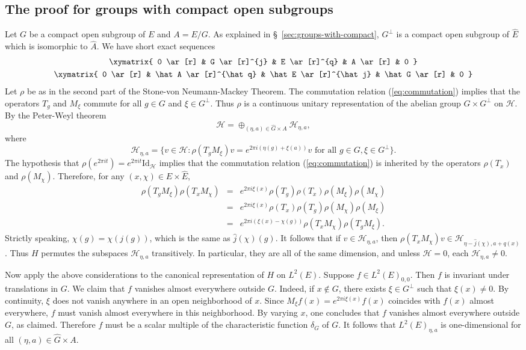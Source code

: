 \documentclass[11pt]{amsart}
\numberwithin{equation}{section}
\theoremstyle{plain}
\theoremstyle{definition}
\newcommand{\Hilb}{\mathcal H}
\newcommand{\ses}[5]{
  \xymatrix{
    0 \ar[r] & #1 \ar[r]^{#4} & #2 \ar[r]^{#5} & #3 \ar[r] & 0
  }
}
\begin{document}
\subsection{The proof for groups with compact open subgroups}
\label{sec:proof-groups-with}
Let $G$ be a compact open subgroup of $E$ and $A=E/G$.
As explained in \S~\ref{sec:groups-with-compact}, $G^\perp$ is a compact open subgroup of $\hat E$ which is isomorphic to $\hat A$.
We have short exact sequences
\begin{gather*}
  \ses G E A j q\\
  \ses {\hat A}{\hat E}{\hat G}{\hat q}{\hat j}
\end{gather*}
Let $\rho$ be as in the second part of the Stone-von Neumann-Mackey Theorem.
The commutation relation (\ref{eq:commutation}) implies that the operators $T_g$ and $M_\xi$ commute for all $g\in G$ and $\xi\in G^\perp$.
Thus $\rho$ is a continuous unitary representation of the abelian group $G\times G^\perp$ on $\Hilb$.
By the Peter-Weyl theorem
\begin{equation*}
  \Hilb=\oplus_{(\eta,a) \in \hat G\times A} \Hilb_{\eta,a},
\end{equation*}
where
\begin{equation*}
  \Hilb_{\eta,a}= \big\{v\in \Hilb: \rho(T_g M_\xi) v = e^{2\pi i(\eta(g)+\xi(a))} v\text{ for all } g\in G, \xi \in G^\perp\big\}.
\end{equation*}
The hypothesis that $\rho(e^{2\pi i t})=e^{2\pi i t}\mathrm{Id}_\Hilb$ implies that the commutation relation (\ref{eq:commutation}) is inherited by the operators $\rho(T_x)$ and $\rho(M_\chi)$.
Therefore, for any $(x,\chi)\in E\times \hat E$,
\begin{eqnarray*}
  \rho(T_g M_\xi) \rho(T_x M_\chi) & = & e^{2\pi i \xi(x)} \rho(T_g) \rho(T_x) \rho(M_\xi) \rho(M_\chi)\\
  & = & e^{2\pi i \xi(x)}\rho(T_x) \rho(T_g) \rho(M_\chi) \rho(M_\xi)\\
  & = & e^{2\pi i(\xi(x)-\chi(g))}\rho(T_x M_\chi) \rho(T_g M_\xi).
\end{eqnarray*}
Strictly speaking, $\chi(g)=\chi(j(g))$, which is the same as $\hat j(\chi)(g)$.
It follows that if $v\in \Hilb_{\eta,a}$, then $\rho(T_x M_\chi) v\in \Hilb_{\eta-\hat j(\chi), a+q(x)}$.
Thus $H$ permutes the subspaces $\Hilb_{\eta,a}$ transitively.
In particular, they are all of the same dimension, and unless $\Hilb=0$, each $\Hilb_{\eta,a}\neq 0$.

Now apply the above considerations to the canonical representation of $H$ on $L^2(E)$.
Suppose $f\in L^2(E)_{0,0}$.
Then $f$ is invariant under translations in $G$.
We claim that $f$ vanishes almost everywhere outside $G$.
Indeed, if $x\notin G$, there exists $\xi\in G^\perp$ such that $\xi(x)\neq 0$.
By continuity, $\xi$ does not vanish anywhere in an open neighborhood of $x$.
Since $M_\xi f(x)=e^{2\pi i \xi(x)}f(x)$ coincides with $f(x)$ almost everywhere, $f$ must vanish almost everywhere in this neighborhood.
By varying $x$, one concludes that $f$ vanishes almost everywhere outside $G$, as claimed.
Therefore $f$ must be a scalar multiple of the characteristic function $\delta_G$ of $G$.
It follows that $L^2(E)_{\eta,a}$ is one-dimensional for all $(\eta,a)\in \hat G\times A$.
\end{document}
